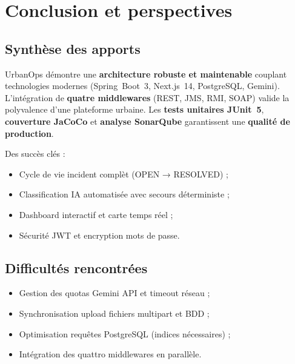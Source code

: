 \documentclass[12pt,a4paper,twoside,openright]{book}
\begin{document}
\chapter{Conclusion et perspectives}
\label{chap:concl}

\section{Synthèse des apports}
UrbanOps démontre une \textbf{architecture robuste et maintenable} couplant technologies modernes (Spring~Boot~3, Next.js~14, PostgreSQL, Gemini). L'intégration de \textbf{quatre middlewares} (REST, JMS, RMI, SOAP) valide la polyvalence d'une plateforme urbaine. Les \textbf{tests unitaires JUnit~5}, \textbf{couverture JaCoCo} et \textbf{analyse SonarQube} garantissent une \textbf{qualité de production}.

Des succès clés :
\begin{itemize}
  \item Cycle de vie incident complèt (OPEN → RESOLVED) ;
  \item Classification IA automatisée avec secours déterministe ;
  \item Dashboard interactif et carte temps réel ;
  \item Sécurité JWT et encryption mots de passe.
\end{itemize}

\section{Difficultés rencontrées}
\begin{itemize}
  \item Gestion des quotas Gemini API et timeout réseau ;
  \item Synchronisation upload fichiers multipart et BDD ;
  \item Optimisation requêtes PostgreSQL (indices nécessaires) ;
  \item Intégration des quattro middlewares en parallèle.
\end{itemize}
\end{document}
